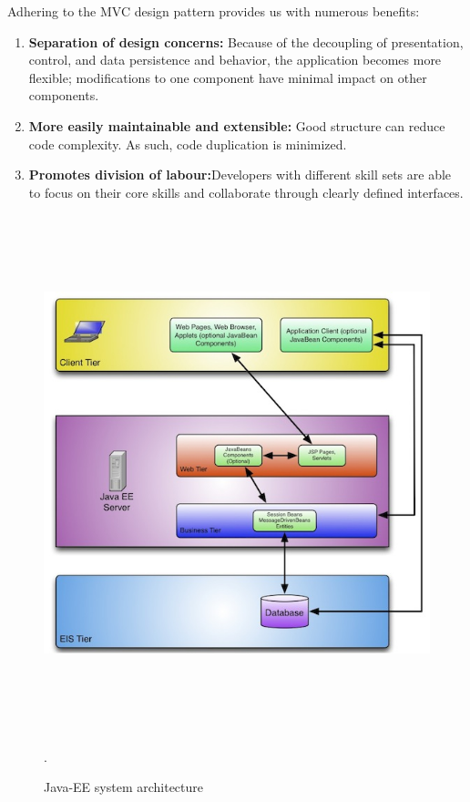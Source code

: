 \begin{flushleft}

Adhering to the MVC design pattern provides us with numerous benefits:

\begin{enumerate}
	\item \textbf{Separation of design concerns:} Because of the decoupling of presentation, control, and data persistence and behavior, the application becomes more flexible; modifications to one component have minimal impact on other components.
	\item \textbf{More easily maintainable and extensible:} Good structure can reduce code complexity. As such, code duplication is minimized.
	\item \textbf{Promotes division of labour:}Developers with different skill sets are able to focus on their core skills and collaborate through clearly defined interfaces.
\end{enumerate}

	\begin{figure}[H]
		\centering\graphicspath{ {images/} }
		\includegraphics[width=\textwidth, height=15cm]{MVC.jpg}
	   	\caption{Java-EE system architecture}.
	\end{figure}


\end{flushleft}
